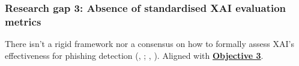 
\subsubsection*{Research gap 3: Absence of standardised XAI evaluation metrics}\label{research-gap-3}
There isn't a rigid framework nor a consensus on how to formally assess XAI's effectiveness for phishing detection (\citeauthor{reddy2023explainable}, \citeyear{reddy2023explainable}; \citeauthor{shendkar2024enhancing}, \citeyear{shendkar2024enhancing}). Aligned with \hyperref[objective-3]{\uline{\textbf{Objective 3}}}.
